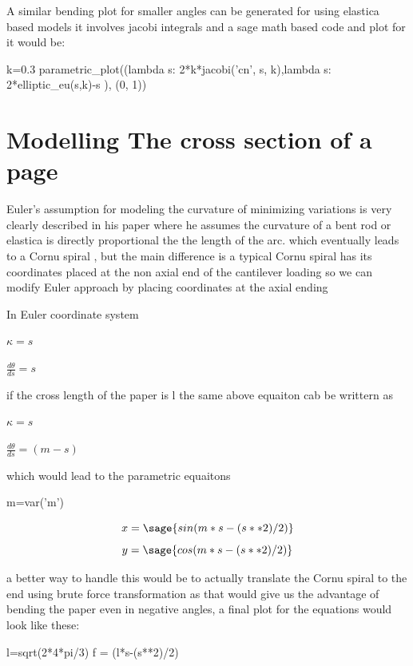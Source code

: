 \documentclass[longbibliography]{revtex4-1}
\begin{document}
A similar bending plot for smaller angles can be generated for using elastica based models it involves jacobi integrals and a sage math based code and plot for it would be:

\begin{sageblock}
k=0.3
parametric_plot((lambda s: 2*k*jacobi('cn', s, k),lambda s: 2*elliptic_eu(s,k)-s ), (0, 1))
\end{sageblock}


\begin{center}
\end{center}

\section{Modelling The cross section of a page}

Euler's assumption for modeling the curvature of minimizing variations is very clearly described in his paper where he assumes the curvature of a bent rod or elastica is directly proportional the the length of the arc. which eventually leads to a Cornu spiral , but the main difference is a typical Cornu spiral has its coordinates placed at the non axial end of the cantilever loading so we can modify Euler approach by placing coordinates at the axial ending

In Euler coordinate system

$\kappa=s$

$\frac{d\theta}{ds} =s$


if the cross length of the paper is l the same above equaiton cab be writtern as

$\kappa=s$

$\frac{d\theta}{ds} =(m-s)$

which would lead to the parametric equaitons 

\begin{sagesilent}
m=var('m')
\end{sagesilent}

\[
x=\sage{sin(m*s-(s**2)/2)}
\]
\[
y=\sage{cos(m*s-(s**2)/2)}
\]

a better way to handle this would be to actually translate the Cornu spiral to the end using brute force transformation as that would give us the advantage of bending the paper even in negative angles, a final plot for the equations would look like these:

\begin{sagesilent}
l=sqrt(2*4*pi/3)
f = (l*s-(s**2)/2)
\end{sagesilent}
\end{document}
